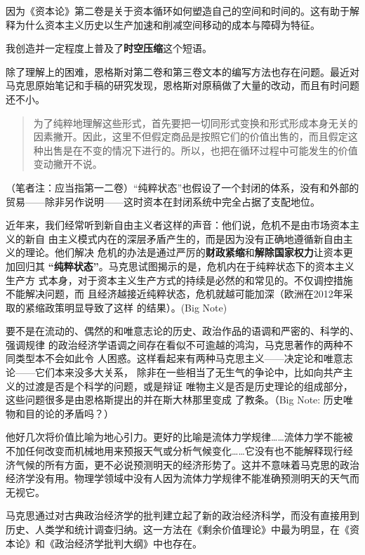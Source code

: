 因为《资本论》第二卷是关于资本循环如何塑造自己的空间和时间的。这有助于解释为什么资本主义历史以生产加速和削减空间移动的成本与障碍为特征。

我创造并一定程度上普及了\textbf{时空压缩}这个短语。

除了理解上的困难，恩格斯对第二卷和第三卷文本的编写方法也存在问题。最近对马克思原始笔记和手稿的研究发现，恩格斯对原稿做了大量的改动，而且有时问题还不小。

\begin{quotation}
为了纯粹地理解这些形式，首先要把一切同形式变换和形式形成本身无关的因素撇开。因此，这里不但假定商品是按照它们的价值出售的，而且假定这种出售是在不变的情况下进行的。所以，也把在循环过程中可能发生的价值变动撇开不说。 

\end{quotation}

（笔者注：应当指第一二卷）“纯粹状态”也假设了一个封闭的体系，没有和外部的贸易------除非另作说明------这时资本在封闭系统中完全占据了支配地位。

近年来，我们经常听到新自由主义者这样的声音：他们说，危机不是由市场资本主义的新自
由主义模式内在的深层矛盾产生的，而是因为没有正确地遵循新自由主义的理论。他们解决
危机的办法是通过严厉的\textbf{财政紧缩}和\textbf{解除国家权力}让资本更加回归其
\textbf{``纯粹状态''}。马克思试图揭示的是，危机内在于纯粹状态下的资本主义生产方
式本身，对于资本主义生产方式的持续是必然的和常见的。不仅调控措施不能解决问题，而
且经济越接近纯粹状态，危机就越可能加深（欧洲在2012年采取的紧缩政策明显导致了这样
的结果）。(Big Note)

要不是在流动的、偶然的和唯意志论的历史、政治作品的语调和严密的、科学的、强调规律
的政治经济学语调之间存在看似不可逾越的鸿沟，马克思著作的两种不同类型本不会如此令
人困惑。这样看起来有两种马克思主义------决定论和唯意志论------它们本来没多大关系，
除非在一些相当了无生气的争论中，比如向共产主义的过渡是否是个科学的问题，或是辩证
唯物主义是否是历史理论的组成部分，这些问题很多是由恩格斯提出的并在斯大林那里变成
了教条。（Big Note: 历史唯物和目的论的矛盾吗？）


他好几次将价值比喻为地心引力。更好的比喻是流体力学规律\ldots{}\ldots{}流体力学不能被不加任何改变而机械地用来预报天气或分析气候变化\ldots{}\ldots{}它没有也不能解释现行经济气候的所有方面，更不必说预测明天的经济形势了。这并不意味着马克思的政治经济学没有用。物理学领域中没有人因为流体力学规律不能准确预测明天的天气而无视它。

马克思通过对古典政治经济学的批判建立起了新的政治经济科学，而没有直接用到历史、人类学和统计调查归纳。这一方法在《剩余价值理论》中最为明显，在《资本论》和《政治经济学批判大纲》中也存在。

